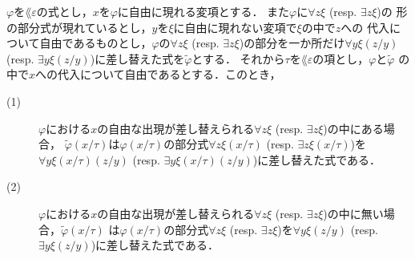 	\begin{screen}
		\begin{metathm}[部分式の差し替えと代入]
		\label{metathm:subformula_replacing_and_substitution}
			$\varphi$を$\lang{\varepsilon}$の式とし，$x$を$\varphi$に自由に現れる変項とする．
			また$\varphi$に$\forall z \xi$ (resp. $\exists z \xi$)の
			形の部分式が現れているとし，$y$を$\xi$に自由に現れない変項で$\xi$の中で$z$への
			代入について自由であるものとし，$\varphi$の$\forall z \xi$ 
			(resp. $\exists z \xi$)の部分を一か所だけ$\forall y \xi(z/y)$ 
			(resp. $\exists y \xi(z/y)$)に差し替えた式を$\widetilde{\varphi}$とする．
			それから$\tau$を$\lang{\varepsilon}$の項とし，$\varphi$と$\widetilde{\varphi}$
			の中で$x$への代入について自由であるとする．このとき，
			\begin{description}
				\item[(1)] $\varphi$における$x$の自由な出現が差し替えられる$\forall z \xi$ 
					(resp. $\exists z \xi$)の中にある場合\footnotemark，
					$\widetilde{\varphi}(x/\tau)$は$\varphi(x/\tau)$の部分式$\forall z \xi(x/\tau)$ 
					(resp. $\exists z \xi(x/\tau)$)を$\forall y \xi(x/\tau)(z/y)$ 
					(resp. $\exists y \xi(x/\tau)(z/y)$)に差し替えた式である．
					
				\item[(2)] $\varphi$における$x$の自由な出現が差し替えられる$\forall z \xi$ 
					(resp. $\exists z \xi$)の中に無い場合，$\widetilde{\varphi}(x/\tau)$
					は$\varphi(x/\tau)$の部分式$\forall z \xi$ 
					(resp. $\exists z \xi$)を$\forall y \xi(z/y)$ 
					(resp. $\exists y \xi(z/y)$)に差し替えた式である．
			\end{description}
		\end{metathm}
	\end{screen}
	
	
